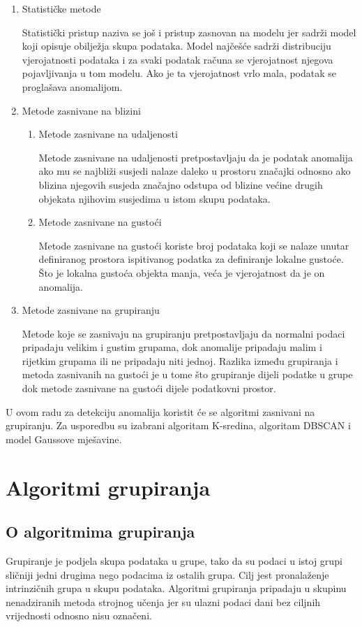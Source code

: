 \documentclass[utf8, diplomski, numeric]{fer}
\begin{document}
\begin{enumerate}
\item Statističke metode

Statistički pristup naziva se još i pristup zasnovan na modelu jer sadrži model koji opisuje obilježja skupa podataka. Model najčešće sadrži distribuciju vjerojatnosti podataka i za svaki podatak računa se vjerojatnost njegova pojavljivanja u tom modelu. Ako je ta vjerojatnost vrlo mala, podatak se proglašava anomalijom.
\item Metode zasnivane na blizini

\begin{enumerate}
\item Metode zasnivane na udaljenosti

Metode zasnivane na udaljenosti pretpostavljaju da je podatak anomalija ako mu se najbliži susjedi nalaze daleko u prostoru značajki odnosno ako blizina njegovih susjeda značajno odstupa od blizine većine drugih objekata njihovim susjedima u istom skupu podataka.
\item Metode zasnivane na gustoći

Metode zasnivane na gustoći koriste broj podataka koji se nalaze unutar definiranog prostora ispitivanog podatka za definiranje lokalne gustoće. Što je lokalna gustoća objekta manja, veća je vjerojatnost da je on anomalija.
\end{enumerate}
\item Metode zasnivane na grupiranju

Metode koje se zasnivaju na grupiranju pretpostavljaju da normalni podaci pripadaju velikim i gustim grupama, dok anomalije pripadaju malim i rijetkim grupama ili ne pripadaju niti jednoj. Razlika između grupiranja i metoda zasnivanih na gustoći je u tome što grupiranje dijeli podatke u grupe dok metode zasnivane na gustoći dijele podatkovni prostor.
\end{enumerate}
U ovom radu za detekciju anomalija koristit će se algoritmi zasnivani na grupiranju. Za usporedbu su izabrani algoritam K-sredina, algoritam DBSCAN i model Gaussove mješavine.


\chapter{Algoritmi grupiranja}
\section{O algoritmima grupiranja}
Grupiranje je podjela skupa podataka u grupe, tako da su podaci u istoj grupi sličniji jedni drugima nego podacima iz ostalih grupa. Cilj jest pronalaženje intrinzičnih grupa u skupu podataka. Algoritmi grupiranja pripadaju u skupinu nenadziranih metoda strojnog učenja jer su ulazni podaci dani bez ciljnih vrijednosti odnosno nisu označeni. 
\end{document}
